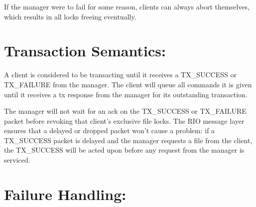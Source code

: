\documentclass[11pt]{article}
\begin{document}
If the manager were to fail for some reason, clients can always abort themselves, which results in all locks freeing eventually.  

\section{Transaction Semantics:} 

A client is considered to be transacting until it receives a TX\_SUCCESS or TX\_FAILURE from the manager. 
The client will queue all commands it is given until it receives a tx response from the manager for its outstanding transaction. 
 
The manager will not wait for an ack on the TX\_SUCCESS or TX\_FAILURE packet before revoking that client's exclusive file locks. The RIO message layer ensures that a delayed or dropped packet won't cause a problem: if a TX\_SUCCESS packet is delayed and the manager requests a file from the client, the TX\_SUCCESS will be acted upon before any request from the manager is serviced. 

\section{Failure Handling:} 
\end{document}

